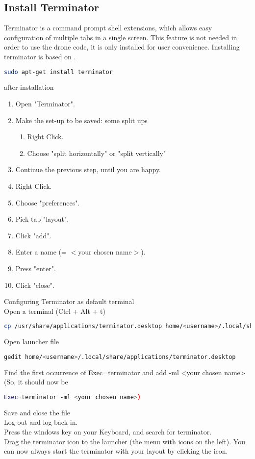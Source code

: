 \subsection{Install Terminator}
Terminator is a command prompt shell extensions, which allows easy configuration of multiple tabs in a single screen. This feature is not needed in order to use the drone code, it is only installed for user convenience. Installing terminator is based on \cite{Col_Term}.
\begin{lstlisting}[language=sh]
sudo apt-get install terminator
\end{lstlisting}
after installation
\begin{enumerate}
	\item Open "Terminator".
	\item Make the set-up to be saved: some split ups
	\begin{enumerate}
		\item Right Click.
		\item Choose "split horizontally" or "split vertically"
	\end{enumerate}
	\item Continue the previous step, until you are happy.
	\item Right Click.
	\item Choose "preferences".
	\item Pick tab "layout".
	\item Click "add".
	\item Enter a name (= $<$your chosen name$>$).
	\item Press "enter".
	\item Click "close".
\end{enumerate}
Configuring Terminator as default terminal\\
Open a terminal (Ctrl + Alt + t)
\begin{lstlisting}[language=sh]
cp /usr/share/applications/terminator.desktop home/<username>/.local/share/applications
\end{lstlisting}
Open launcher file
\begin{lstlisting}[language=sh]
gedit home/<username>/.local/share/applications/terminator.desktop
\end{lstlisting}
Find the first occurrence of Exec=terminator and add -ml <your chosen name> (So, it should now be 
\begin{lstlisting}[language=sh]
Exec=terminator -ml <your chosen name>)
\end{lstlisting}
Save and close the file\\
Log-out and log back in.\\
Press the windows key on your Keyboard, and search for terminator.\\
Drag the terminator icon to the launcher (the menu with icons on the left). You can now always start the terminator with your layout by clicking the icon.

